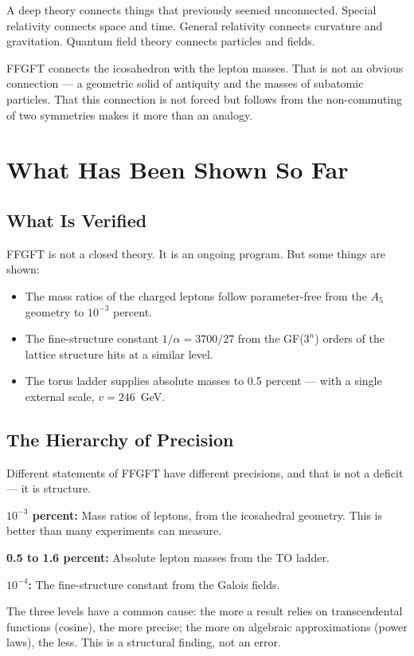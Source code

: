 \documentclass[12pt,oneside]{book}
\begin{document}
A deep theory connects things that previously seemed unconnected. Special relativity connects space and time. General relativity connects curvature and gravitation. Quantum field theory connects particles and fields.

FFGFT connects the icosa\-hedron with the lepton masses. That is not an obvious connection --- a geometric solid of antiquity and the masses of subatomic particles. That this connection is not forced but follows from the non-commuting of two symmetries makes it more than an analogy.

\chapter{What Has Been Shown So Far}

\section{What Is Verified}

FFGFT is not a closed theory. It is an ongoing program. But some things are shown:

\begin{itemize}
\item The mass ratios of the charged leptons follow parameter-free from the $A_5$ geometry to $10^{-3}$ percent.
\item The fine-structure constant $1/\alpha = 3700/27$ from the GF($3^n$) orders of the lattice structure hits at a similar level.
\item The torus ladder supplies absolute masses to 0.5 percent --- with a single external scale, $v = 246$~GeV.
\end{itemize}

\section{The Hierarchy of Precision}

Different statements of FFGFT have different precisions, and that is not a deficit --- it is structure.

\textbf{$10^{-3}$ percent:} Mass ratios of leptons, from the icosahedral geometry. This is better than many experiments can measure.

\textbf{0.5 to 1.6 percent:} Absolute lepton masses from the TO ladder.

\textbf{$10^{-4}$:} The fine-structure constant from the Galois fields.

The three levels have a common cause: the more a result relies on transcendental functions (cosine), the more precise; the more on algebraic approximations (power laws), the less. This is a structural finding, not an error.
\end{document}
